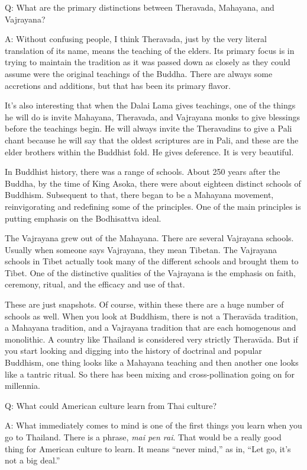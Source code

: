 \qaspace
Q: What are the primary distinctions between Theravada, Mahayana, and
Vajrayana?

\qaspace
A: Without confusing people, I think Theravada, just by the very literal
translation of its name, means the teaching of the elders. Its primary
focus is in trying to maintain the tradition as it was passed down as
closely as they could assume were the original teachings of the Buddha.
There are always some accretions and additions, but that has been its
primary flavor.

It’s also interesting that when the Dalai Lama gives teachings, one of
the things he will do is invite Mahayana, Theravada, and Vajrayana monks
to give blessings before the teachings begin. He will always invite the
Theravadins to give a Pali chant because he will say that the oldest
scriptures are in Pali, and these are the elder brothers within the
Buddhist fold. He gives deference. It is very beautiful.

In Buddhist history, there was a range of schools. About 250 years after
the Buddha, by the time of King Asoka, there were about eighteen
distinct schools of Buddhism. Subsequent to that, there began to be a
Mahayana movement, reinvigorating and redefining some of the principles.
One of the main principles is putting emphasis on the Bodhisattva ideal.

The Vajrayana grew out of the Mahayana. There are several Vajrayana
schools. Usually when someone says Vajrayana, they mean Tibetan. The
Vajrayana schools in Tibet actually took many of the different schools
and brought them to Tibet. One of the distinctive qualities of the
Vajrayana is the emphasis on faith, ceremony, ritual, and the efficacy
and use of that.

These are just snapshots. Of course, within these there are a huge
number of schools as well. When you look at Buddhism, there is not a
Theravāda tradition, a Mahayana tradition, and a Vajrayana tradition
that are each homogenous and monolithic. A country like Thailand is
considered very strictly Theravāda. But if you start looking and digging
into the history of doctrinal and popular Buddhism, one thing looks like
a Mahayana teaching and then another one looks like a tantric ritual. So
there has been mixing and cross-pollination going on for millennia.

\qaspace
Q: What could American culture learn from Thai culture?

\qaspace
A: What immediately comes to mind is one of the first things you learn
when you go to Thailand. There is a phrase, \emph{mai pen rai}. That
would be a really good thing for American culture to learn. It means
“never mind,” as in, “Let go, it’s not a big deal.”

